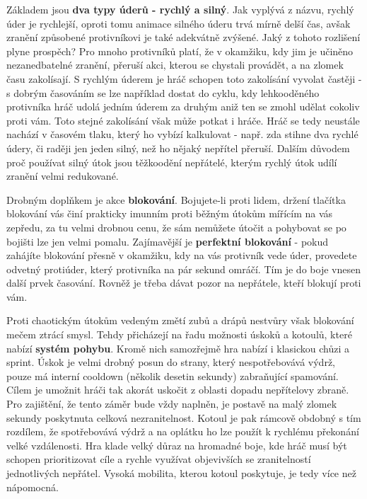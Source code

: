 Základem jsou \textbf{dva typy úderů - rychlý a silný}. Jak vyplývá z názvu, rychlý úder je rychlejší, oproti tomu animace silného úderu trvá mírně delší čas, avšak zranění způsobené protivníkovi je také adekvátně zvýšené. Jaký z tohoto rozlišení plyne prospěch? Pro mnoho protivníků platí, že v okamžiku, kdy jim je učiněno nezanedbatelné zranění, přeruší akci, kterou se chystali provádět, a na zlomek času zakolísají. S rychlým úderem je hráč schopen toto zakolísání vyvolat častěji - s dobrým časováním se lze například dostat do cyklu, kdy lehkooděného protivníka hráč udolá jedním úderem za druhým aniž ten se zmohl udělat cokoliv proti vám. Toto stejné zakolísání však může potkat i hráče. Hráč se tedy neustále nachází v časovém tlaku, který ho vybízí kalkulovat - např. zda stihne dva rychlé údery, či raději jen jeden silný, než ho nějaký nepřítel přeruší. Dalším důvodem proč používat silný útok jsou těžkoodění nepřátelé, kterým rychlý útok udílí zranění velmi redukované. 

Drobným doplňkem je akce \textbf{blokování}. Bojujete-li proti lidem, držení tlačítka blokování vás činí prakticky imunním proti běžným útokům mířícím na vás zepředu, za tu velmi drobnou cenu, že sám nemůžete útočit a pohybovat se po bojišti lze jen velmi pomalu. Zajímavější je \textbf{perfektní blokování} - pokud zahájíte blokování přesně v okamžiku, kdy na vás protivník vede úder, provedete odvetný protiúder, který protivníka na pár sekund omráčí. Tím je do boje vnesen další prvek časování. Rovněž je třeba dávat pozor na nepřátele, kteří blokují proti vám.
\bigbreak

Proti chaotickým útokům vedeným změtí zubů a drápů nestvůry však blokování mečem ztrácí smysl. Tehdy přicházejí na řadu možnosti úskoků a kotoulů, které nabízí \textbf{systém pohybu}. Kromě nich samozřejmě hra nabízí i klasickou chůzi a sprint. Úskok je velmi drobný posun do strany, který nespotřebovává výdrž, pouze má interní cooldown (několik desetin sekundy) zabraňující spamování. Cílem je umožnit hráči tak akorát uskočit z oblasti dopadu nepřítelovy zbraně. Pro zajištění, že tento záměr bude vždy naplněn, je postavě na malý zlomek sekundy poskytnuta celková nezranitelnost. Kotoul je pak rámcově obdobný s tím rozdílem, že spotřebovává výdrž a na oplátku ho lze použít k rychlému překonání velké vzdálenosti. Hra klade velký důraz na hromadné boje, kde hráč musí být schopen prioritizovat cíle a rychle využívat objevivších se zranitelností jednotlivých nepřátel. Vysoká mobilita, kterou kotoul poskytuje, je tedy více než nápomocná.  

